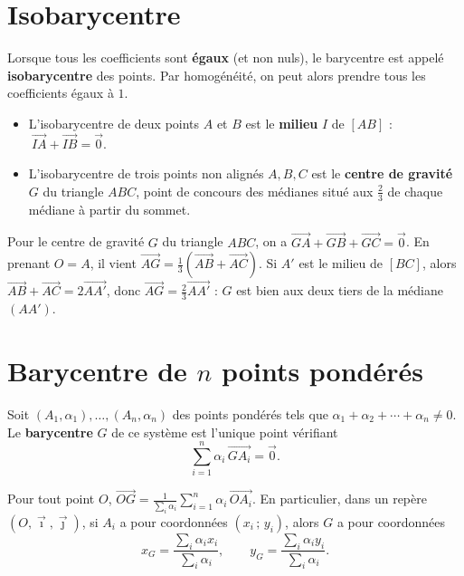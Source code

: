 \section{Isobarycentre}

\begin{definition}[Isobarycentre]
Lorsque tous les coefficients sont \textbf{égaux} (et non nuls), le barycentre est
appelé \textbf{isobarycentre} des points. Par homogénéité, on peut alors prendre tous
les coefficients égaux à $1$.
\end{definition}

\begin{propriete}\leavevmode
\begin{itemize}
  \item L'isobarycentre de deux points $A$ et $B$ est le \textbf{milieu} $I$ de
        $[AB]$ : $\ \vec{IA}+\vec{IB}=\vec{0}$.
  \item L'isobarycentre de trois points non alignés $A,B,C$ est le \textbf{centre de
        gravité} $G$ du triangle $ABC$, point de concours des médianes situé aux
        $\tfrac{2}{3}$ de chaque médiane à partir du sommet.
\end{itemize}
\end{propriete}

\begin{exemple}
Pour le centre de gravité $G$ du triangle $ABC$, on a
$\vec{GA}+\vec{GB}+\vec{GC}=\vec{0}$. En prenant $O=A$, il vient
$\vec{AG}=\tfrac13(\vec{AB}+\vec{AC})$. Si $A'$ est le milieu de $[BC]$, alors
$\vec{AB}+\vec{AC}=2\vec{AA'}$, donc $\vec{AG}=\tfrac23\vec{AA'}$ : $G$ est bien aux
deux tiers de la médiane $(AA')$.
\end{exemple}

\section{Barycentre de $n$ points pondérés}

\begin{definition}
Soit $(A_1,\alpha_1),\dots,(A_n,\alpha_n)$ des points pondérés tels que
$\alpha_1+\alpha_2+\cdots+\alpha_n\neq 0$. Le \textbf{barycentre} $G$ de ce système
est l'unique point vérifiant
\[ \sum_{i=1}^{n}\alpha_i\,\vec{GA_i}=\vec{0}. \]
\end{definition}

\begin{theoreme}
Pour tout point $O$, $\displaystyle\vec{OG}=\frac{1}{\sum_i\alpha_i}\sum_{i=1}^{n}\alpha_i\,\vec{OA_i}$.
En particulier, dans un repère $(O,\vec{\imath},\vec{\jmath})$, si $A_i$ a pour
coordonnées $(x_i\,;\,y_i)$, alors $G$ a pour coordonnées
\[ x_G=\frac{\sum_i\alpha_i x_i}{\sum_i\alpha_i},\qquad
   y_G=\frac{\sum_i\alpha_i y_i}{\sum_i\alpha_i}. \]
\end{theoreme}

